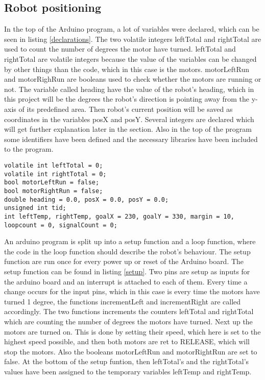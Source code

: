 \subsection{Robot positioning}
\label{sec:Robot positioning Implementation}
In the top of the Arduino program, a lot of variables were declared, which can be seen in listing \ref{declarations}. The two volatile integers leftTotal and rightTotal are used to count the number of degrees the motor have turned. leftTotal and rightTotal are volatile integers because the value of the variables can be changed by other things than the code, which in this case is the motors. \newline
motorLeftRun and motorRighRun are booleans used to check whether the motors are running or not. \newline
The variable called heading have the value of the robot's heading, which in this project will be the degrees the robot's direction is pointing away from the y-axis of its predefined area. Then robot's current position will be saved as coordinates in the variables posX and posY. \newline
Several integers are declared which will get further explanation later in the section. 
Also in the top of the program some identifiers have been defined and the necessary libraries have been included to the program.  

\begin{lstlisting}[caption={The defined and declared variables}, label={declarations}]
volatile int leftTotal = 0;
volatile int rightTotal = 0;
bool motorLeftRun = false;
bool motorRightRun = false;
double heading = 0.0, posX = 0.0, posY = 0.0;
unsigned int tid;
int leftTemp, rightTemp, goalX = 230, goalY = 330, margin = 10, loopcount = 0, signalCount = 0;
\end{lstlisting}

An arduino program is split up into a setup function and a loop function, where the code in the loop function should describe the robot's behaviour. The setup function are run once for every power up or reset of the Arduino board.
The setup function can be found in listing \ref{setup}. Two pins are setup as inputs for the arduino board and an interrupt is attached to each of them. Every time a change occurs for the input pins, which in this case is every time the motors have turned 1 degree, the functions incrementLeft and incrementRight are called accordingly. The two functions increments the counters leftTotal and rightTotal which are counting the number of degrees the motors have turned. \newline
Next up the motors are turned on. This is done by setting their speed, which here is set to the highest speed possible, and then both motors are ret to RELEASE, which will stop the motors. Also the booleans motorLeftRun and motorRightRun are set to false. \newline
At the bottom of the setup funtion, then leftTotal's and the rightTotal's values have been assigned to the temporary variables leftTemp and rightTemp.

